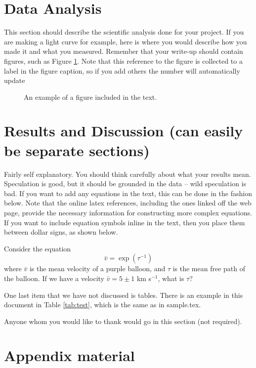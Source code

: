 \documentclass{emulateapj}
\begin{document}
\section{Data Analysis}

This section should describe the scientific analysis done for your project. If you are
making a light curve for example, here is where you would describe how you made it and what you measured.
Remember that your write-up should contain figures, such as Figure \ref{fig:test}. Note that this
reference to the figure is collected to a label in the figure caption, so if you add others the
number will automatically update

\begin{figure}
\caption{An example of a figure included in the text. \label{fig:test}}
\end{figure}

\section{Results and Discussion (can easily be separate sections)}

Fairly self explanatory. You should think carefully about what your results 
mean. Speculation is good, but it should be grounded in the data -- wild
speculation is bad.  If you want to add any equations in the text, this
can be done in the fashion below. Note that the online latex references, 
including the ones linked off the web page, provide the necessary information
for constructing more complex equations. If you want to include equation
symbols inline in the text, then you place them between dollar signs, as
shown below.

Consider the equation
\begin{equation}
\bar v = \exp(\tau^{-1})
\end{equation}
where $\bar v$ is the mean velocity of a purple balloon, and $\tau$ is
the mean free path of the balloon. If we have a velocity $\bar v = 5\pm1$ km s$^{-1}$,
what is $\tau$?

One last item that we have not discussed is tables. There is an example in this
document in Table \ref{tab:test}, which is the same as in sample.tex.

\acknowledgments

Anyone whom you would like to thank would go in this section (not required). 


\appendix

\section{Appendix material}
\end{document}
